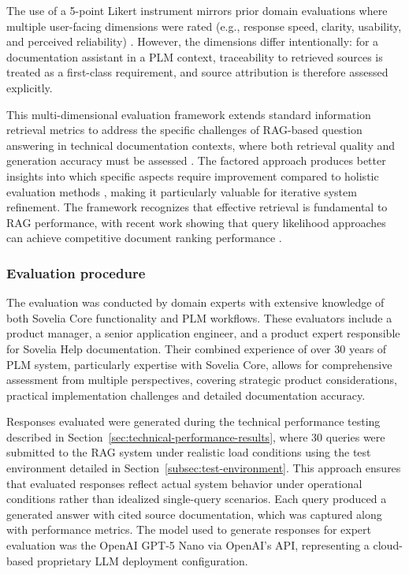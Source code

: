The use of a 5-point Likert instrument mirrors prior domain evaluations where multiple user-facing dimensions were rated (e.g., response speed, clarity, usability, and perceived reliability) \parencite{namLoRATunedMultimodalRAG2025}. However, the dimensions differ intentionally: for a documentation assistant in a PLM context, traceability to retrieved sources is treated as a first-class requirement, and source attribution is therefore assessed explicitly.

This multi-dimensional evaluation framework extends standard information retrieval metrics \parencite{manningIntroductionInformationRetrieval2008a} to address the specific challenges of RAG-based question answering in technical documentation contexts, where both retrieval quality and generation accuracy must be assessed \parencite{namLoRATunedMultimodalRAG2025}. The factored approach produces better insights into which specific aspects require improvement compared to holistic evaluation methods \parencite{AbeysingheBhashithe2024TCoE}, making it particularly valuable for iterative system refinement. The framework recognizes that effective retrieval is fundamental to RAG performance, with recent work showing that query likelihood approaches can achieve competitive document ranking performance \parencite{ZhuangShengyao2023OLLM}.

\subsubsection{Evaluation procedure}
\label{subsubsec:evaluation-procedure}

The evaluation was conducted by domain experts with extensive knowledge of both Sovelia Core functionality and PLM workflows. These evaluators include a product manager, a senior application engineer, and a product expert responsible for Sovelia Help documentation. Their combined experience of over 30 years of PLM system, particularly expertise with Sovelia Core, allows for comprehensive assessment from multiple perspectives, covering strategic product considerations, practical implementation challenges and detailed documentation accuracy.

Responses evaluated were generated during the technical performance testing described in Section~\ref{sec:technical-performance-results}, where 30 queries were submitted to the RAG system under realistic load conditions using the test environment detailed in Section~\ref{subsec:test-environment}. This approach ensures that evaluated responses reflect actual system behavior under operational conditions rather than idealized single-query scenarios. Each query produced a generated answer with cited source documentation, which was captured along with performance metrics. The model used to generate responses for expert evaluation was the OpenAI GPT-5 Nano via OpenAI's API, representing a cloud-based proprietary LLM deployment configuration.

